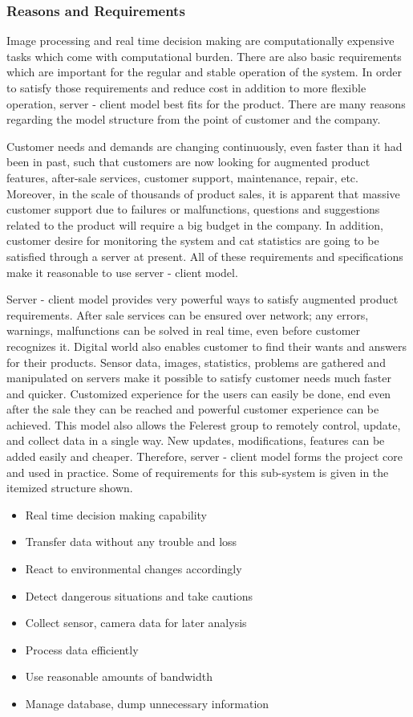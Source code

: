 \subsubsection{Reasons and Requirements}
Image processing and real time decision making are computationally expensive tasks which come with computational burden. There are also basic requirements which are important for the regular and stable operation of the system. In order to satisfy those requirements and reduce cost in addition to more flexible operation, server - client model best fits for the product. There are many reasons regarding the model structure from the point of customer and the company.

Customer needs and demands are changing continuously, even faster than it had been in past, such that customers are now looking for augmented product features, after-sale services, customer support, maintenance, repair, etc. Moreover, in the scale of thousands of product sales, it is apparent that massive customer support due to failures or malfunctions, questions and suggestions related to the product will require a big budget in the company. In addition, customer desire for monitoring the system and cat statistics are going to be satisfied through a server at present. All of these requirements and specifications make it reasonable to use server - client model.

Server - client model provides very powerful ways to satisfy augmented product requirements. After sale services can be ensured over network; any errors, warnings, malfunctions can be solved in real time, even before customer recognizes it. Digital world also enables customer to find their wants and answers for their products. Sensor data, images, statistics, problems are gathered and manipulated on servers make it possible to satisfy customer needs much faster and quicker. Customized experience for the users can easily be done, end even after the sale they can be reached and powerful customer experience can be achieved. This model also allows the Felerest group to remotely control, update, and collect data in a single way. New updates, modifications, features can be added easily and cheaper. Therefore, server - client model forms the project core and used in practice. Some of requirements for this sub-system is given in the itemized structure shown.

\begin{itemize}
    \item Real time decision making capability
    \item Transfer data without any trouble and loss
    \item React to environmental changes accordingly
    \item Detect dangerous situations and take cautions
    \item Collect sensor, camera data for later analysis
    \item Process data efficiently
    \item Use reasonable amounts of bandwidth
    \item Manage database, dump unnecessary information
\end{itemize}

